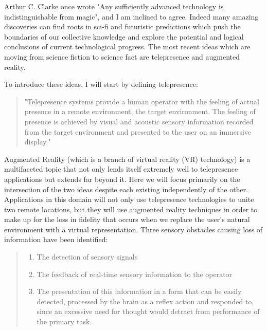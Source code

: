 \documentclass[a4paper,12pt]{report}
\begin{document}
Arthur C. Clarke once wrote "Any sufficiently advanced technology is indistinguishable from magic", and I am inclined to agree. Indeed many amazing discoveries can find roots in sci-fi and futuristic predictions which push the boundaries of our collective knowledge and explore the potential and logical conclusions of current technological progress. The most recent ideas which are moving from science fiction to science fact are telepresence and augmented reality. 
	\begin{flushright}
		\cite{0001}
	\end{flushright}

To introduce these ideas, I will start by defining telepresence:

\begin{quotation}
"Telepresence systems provide a human operator with the feeling of actual presence in a remote environment, the target environment. The feeling of presence is achieved by visual and acoustic sensory information recorded from the target environment and presented to the user on an immersive display."
	\begin{flushright}
		\cite{6094998}
	\end{flushright}
\end{quotation}

Augmented Reality (which is a branch of virtual reality (VR) technology) is a multifaceted topic that not only lends itself extremely well to telepresence applications but extends far beyond it. Here we will focus primarily on the intersection of the two ideas despite each existing independently of the other. Applications in this domain will not only use telepresence technologies to unite two remote locations, but they will use augmented reality techniques in order to make up for the loss in fidelity that occurs when we replace the user's natural environment with a virtual representation. Three sensory obstacles causing loss of information have been identified:
\begin{quote}

	\begin{enumerate}
		\item The detection of sensory signals
		\item The feedback of real-time sensory information to the operator
		\item The presentation of this information in a form that can be easily detected, processed by the brain as a reflex action and responded to, since an excessive need for thought would detract from performance of the primary task.
	\end{enumerate}
	\begin{flushright}
		\cite{540147}
	\end{flushright}
\end{quote}
\end{document}
